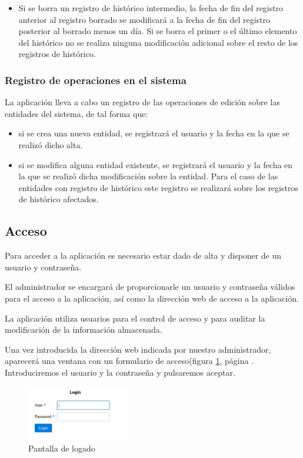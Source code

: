 \begin{itemize}
\begin{itemize}
	\end{itemize}
	\item Si se borra un registro de histórico intermedio, la fecha de fin del registro anterior al registro borrado se modificará a la fecha de fin del registro posterior al borrado menos un día. Si se borra el primer o el último elemento del histórico no se realiza ninguna modificación adicional sobre el resto de los registros de histórico.	
\end{itemize}


\subsubsection{Registro de operaciones en el sistema}
\label{sub:registro-operaciones}

La aplicación lleva a cabo un registro de las operaciones de edición sobre las entidades del sistema, de tal forma que:
\begin{itemize}
\item si se crea una nueva entidad, se registrará el usuario y la fecha en la que se realizó dicho alta.
\item si se modifica alguna entidad existente, se registrará el usuario y la fecha en la que se realizó dicha modificación sobre la entidad. Para el caso de las entidades con registro de histórico este registro se realizará sobre los registros de histórico afectados.
\end{itemize}



\subsection{Acceso}

Para acceder a la aplicación es necesario estar dado de alta y disponer de un
usuario y contraseña.

El administrador se encargará de proporcionarle un usuario y contraseña válidos para el acceso a la aplicación, así como la dirección web de acceso a la aplicación.

La aplicación utiliza usuarios para el control de acceso y para auditar la
modificación de la información almacenada. 

Una vez introducida la dirección web indicada por nuestro administrador, aparecerá una ventana con un formulario de acceso(figura \ref{fig:login}, página \pageref{fig:login}. Introduciremos el usuario y la contraseña y pulsaremos aceptar. 


\begin{figure}[H]
  \centering
  \includegraphics[width=0.40\textwidth]{imaxes/login.png}
  \caption{Pantalla de logado}
  \label{fig:login}
\end{figure}

